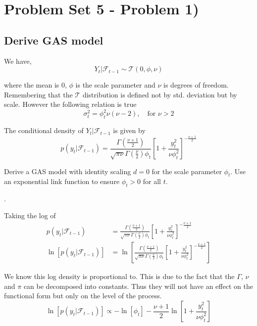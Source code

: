 \documentclass{article}
\begin{document}
\section{Problem Set 5 - Problem 1)}

\subsection{Derive GAS model}

We have,
\[
Y_{t}\rvert\mathcal{F}_{t-1}\sim\mathcal{T}\left(0,\phi,\nu\right)
\]

where the mean is $0$, $\phi$ is the scale parameter and $\nu$
is degrees of freedom. Remembering that the $\mathcal{T}$ distribution
is defined not by std. deviation but by scale. However the following
relation is true
\[
\sigma_{t}^{2}=\phi_{t}^{2}\nu\left(\nu-2\right),\quad\text{for }\nu>2
\]

The conditional density of $Y_{t}\rvert\mathcal{F}_{t-1}$ is given
by
\[
p\left(y_{t}\rvert\mathcal{F}_{t-1}\right)=\frac{\Gamma\left(\frac{\nu+1}{2}\right)}{\sqrt{\pi\nu}\Gamma\left(\frac{\nu}{2}\right)\phi_{t}}\left[1+\frac{y_{t}^{2}}{\nu\phi_{t}^{2}}\right]^{-\frac{\nu+1}{2}}
\]

Derive a GAS model with identity scaling $d=0$ for the scale parameter
$\phi_{t}$. Use an exponential link function to ensure $\phi_{t}>0$
for all $t$.

.

Taking the log of
\begin{align*}
p\left(y_{t}\rvert\mathcal{F}_{t-1}\right) & =\frac{\Gamma\left(\frac{\nu+1}{2}\right)}{\sqrt{\pi\nu}\Gamma\left(\frac{\nu}{2}\right)\phi_{t}}\left[1+\frac{y_{t}^{2}}{\nu\phi_{t}^{2}}\right]^{-\frac{\nu+1}{2}}\\
\ln\left[p\left(y_{t}\rvert\mathcal{F}_{t-1}\right)\right] & =\ln\left[\frac{\Gamma\left(\frac{\nu+1}{2}\right)}{\sqrt{\pi\nu}\Gamma\left(\frac{\nu}{2}\right)\phi_{t}}\left[1+\frac{y_{t}^{2}}{\nu\phi_{t}^{2}}\right]^{-\frac{\nu+1}{2}}\right]
\end{align*}

We know this log density is proportional to. This is due to the fact
that the $\Gamma$, $\nu$ and $\pi$ can be decomposed into constants.
Thus they will not have an effect on the functional form but only
on the level of the process. 
\[
\ln\left[p\left(y_{t}\rvert\mathcal{F}_{t-1}\right)\right]\propto-\ln\left[\phi_{t}\right]-\frac{\nu+1}{2}\ln\left[1+\frac{y_{t}^{2}}{\nu\phi_{t}^{2}}\right]
\]
\end{document}
